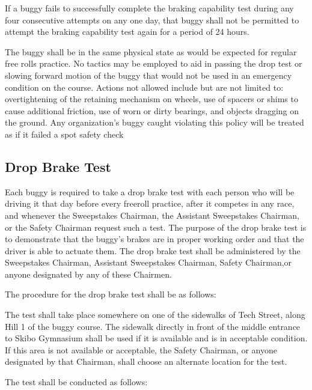 	If a buggy fails to successfully complete the braking capability test during
	any four consecutive attempts on any one day, that buggy shall not be permitted
	to attempt the braking capability test again for a period of 24 hours.

	The buggy shall be in the same physical state as would be expected for regular
	free rolls practice. No tactics may be employed to aid in passing the drop test
	or slowing forward motion of the buggy that would not be used in an emergency
	condition on the course. Actions not allowed include but are not limited to:
	overtightening of the retaining mechanism on wheels, use of spacers or shims to
	cause additional friction, use of worn or dirty bearings, and objects dragging
	on the ground. Any organization's buggy caught violating this policy will be
	treated as if it failed a spot safety check

\subsection{Drop Brake Test}

	Each buggy is required to take a drop brake test with each person who will
    be driving it that day before every freeroll practice, after it
    competes in any race, and whenever the Sweepstakes Chairman,
	the Assistant Sweepstakes Chairman, or the Safety Chairman request such a test.
	The purpose of the drop brake test is to demonstrate that the buggy's brakes
	are in proper working order and that the driver is able to actuate them. The
	drop brake test shall be administered by the Sweepstakes Chairman, Assistant
	Sweepstakes Chairman, Safety Chairman,or anyone designated by any of these
	Chairmen.
	\newline

	\noindent The procedure for the drop brake test shall be as follows:

	The test shall take place somewhere on one of the sidewalks of Tech Street,
	along Hill 1 of the buggy course. The sidewalk directly in front of the middle
	entrance to Skibo Gymnasium shall be used if it is available and is in
	acceptable condition. If this area is not available or acceptable, the Safety
	Chairman, or anyone designated by that Chairman, shall choose an alternate
	location for the test.
	\newline

	\noindent The test shall be conducted as follows:

